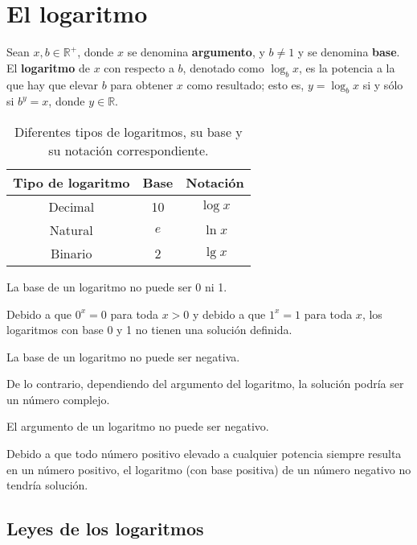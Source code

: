 \chapter{El logaritmo}

Sean \(x,b\in\mathbb{R}^+\), donde \(x\) se denomina \textbf{argumento}, y \(b\neq 1\) y se denomina \textbf{base}.
El \textbf{logaritmo} de \(x\) con respecto a \(b\), denotado como \(\log_{b}x\), es la potencia a la que hay que elevar \(b\) para obtener \(x\) como resultado; esto es, \(y=\log_{b}x\) si y sólo si \(b^{y}=x\), donde \(y\in\mathbb{R}\).

\begin{table}[h]
  \caption{Diferentes tipos de logaritmos, su base y su notación correspondiente.}
  \begin{center}
    \begin{tabular}{ccc}
      \toprule
      Tipo de logaritmo & Base & Notación \\
      \midrule
      Decimal & 10 & \(\log{x}\) \\
      Natural & \(e\) & \(\ln{x}\) \\
      Binario & 2 & \(\lg{x}\) \\
      \bottomrule
    \end{tabular}
  \end{center}
\end{table}

\begin{prop}
  La base de un logaritmo no puede ser 0 ni 1.
\end{prop}
  
Debido a que \(0^x=0\) para toda \(x>0\) y debido a que \(1^x=1\) para toda \(x\), los logaritmos con base 0 y 1 no tienen una solución definida.

\begin{prop}
  La base de un logaritmo no puede ser negativa.
\end{prop}

De lo contrario, dependiendo del argumento del logaritmo, la solución podría ser un número complejo.

\begin{prop}
  El argumento de un logaritmo no puede ser negativo.
\end{prop}

Debido a que todo número positivo elevado a cualquier potencia siempre resulta en un número positivo, el logaritmo (con base positiva) de un número negativo no tendría solución.

\section{Leyes de los logaritmos}

